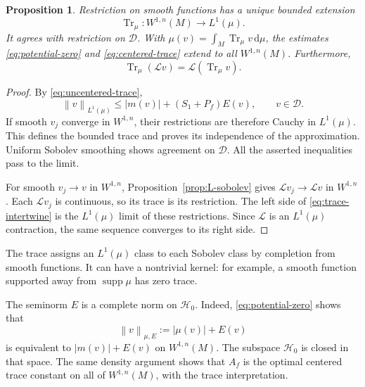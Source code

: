 \documentclass[10pt,a4paper]{amsart}
\newtheorem{proposition}[theorem]{Proposition}
\newcommand{\Lop}{\mathcal L}
\newcommand{\Hcal}{\mathcal H}
\newcommand{\Dcal}{\mathcal D}
\newcommand{\Tr}{\operatorname{Tr}_{\mu}}
\newcommand{\norm}[1]{\left\lVert #1\right\rVert}
\newcommand{\dd}{\mathrm d}
\DeclareMathOperator{\supp}{supp}
\numberwithin{equation}{section}
\begin{document}
\begin{proposition}\label{prop:trace-extension}
Restriction on smooth functions has a unique bounded extension
\[
 \Tr\colon W^{1,n}(M)\longrightarrow L^1(\mu).
\]
It agrees with restriction on $\Dcal$. With $\mu(v)=\int_M\Tr v\,\dd\mu$, the estimates \eqref{eq:potential-zero} and \eqref{eq:centered-trace} extend to all $W^{1,n}(M)$. Furthermore,
\begin{equation}\label{eq:trace-intertwine}
 \Tr(\Lop v)=\Lop(\Tr v).
\end{equation}
\end{proposition}

\begin{proof}
By \eqref{eq:uncentered-trace},
\[
 \norm{v}_{L^1(\mu)}\le |m(v)|+(S_1+P_f)E(v),\qquad v\in\Dcal.
\]
If smooth $v_j$ converge in $W^{1,n}$, their restrictions are therefore Cauchy in $L^1(\mu)$. This defines the bounded trace and proves its independence of the approximation. Uniform Sobolev smoothing shows agreement on $\Dcal$. All the asserted inequalities pass to the limit.

For smooth $v_j\to v$ in $W^{1,n}$, Proposition~\ref{prop:L-sobolev} gives $\Lop v_j\to\Lop v$ in $W^{1,n}$. Each $\Lop v_j$ is continuous, so its trace is its restriction. The left side of \eqref{eq:trace-intertwine} is the $L^1(\mu)$ limit of these restrictions. Since $\Lop$ is an $L^1(\mu)$ contraction, the same sequence converges to its right side.
\end{proof}

The trace assigns an $L^1(\mu)$ class to each Sobolev class by completion from smooth functions. It can have a nontrivial kernel: for example, a smooth function supported away from $\supp\mu$ has zero trace.

The seminorm $E$ is a complete norm on $\Hcal_0$. Indeed, \eqref{eq:potential-zero} shows that
\begin{equation}\label{eq:norm-equivalence}
 \norm{v}_{\mu,E}:=|\mu(v)|+E(v)
\end{equation}
is equivalent to $|m(v)|+E(v)$ on $W^{1,n}(M)$. The subspace $\Hcal_0$ is closed in that space. The same density argument shows that $A_f$ is the optimal centered trace constant on all of $W^{1,n}(M)$, with the trace interpretation.
\end{document}
